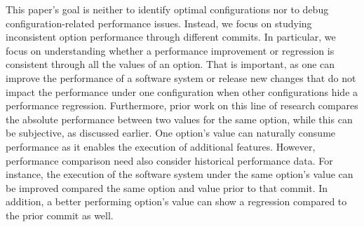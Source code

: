 This paper’s goal is neither to identify optimal configurations nor to debug configuration-related performance issues. Instead, we focus on studying inconsistent option performance through different commits. In particular, we focus on understanding whether a performance improvement or regression is consistent through all the values of an option. That is important, as one can improve the performance of a software system or release new changes that do not impact the performance under one configuration when other configurations hide a performance regression. 
Furthermore, prior work on this line of research compares the absolute performance between two values for the same option, while this can be subjective, as discussed earlier. One option's value can naturally consume performance as it enables the execution of additional features. However, performance comparison need also consider historical performance data. For instance, the execution of the software system under the same option's value can be improved %
compared the same option and value prior to that commit. In addition, a better performing option's value can show a regression compared to the prior commit as well. %



